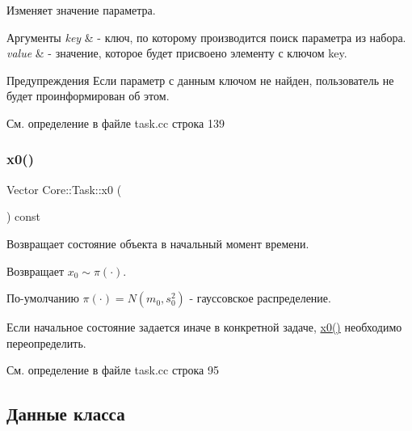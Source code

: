 Изменяет значение параметра. 


\begin{DoxyParams}{Аргументы}
{\em key} & -\/ ключ, по которому производится поиск параметра из набора. \\
\hline
{\em value} & -\/ значение, которое будет присвоено элементу с ключом key.\\
\hline
\end{DoxyParams}
\begin{DoxyWarning}{Предупреждения}
Если параметр с данным ключом не найден, пользователь не будет проинформирован об этом. 
\end{DoxyWarning}


См. определение в файле task.\+cc строка 139

\hypertarget{class_core_1_1_task_aa550c0258f341215291fba1e8518c135}{}\label{class_core_1_1_task_aa550c0258f341215291fba1e8518c135} 
\subsubsection{\texorpdfstring{x0()}{x0()}}
{\footnotesize\ttfamily Vector Core\+::\+Task\+::x0 (\begin{DoxyParamCaption}{ }\end{DoxyParamCaption}) const\hspace{0.3cm}{\ttfamily [virtual]}}



Возвращает состояние объекта в начальный момент времени. 

\begin{DoxyReturn}{Возвращает}
$x_0 \sim \pi(\cdot)$.
\end{DoxyReturn}
По-\/умолчанию $\pi(\cdot) = N(m_0, s_0^2)$ -\/ гауссовское распределение.

Если начальное состояние задается иначе в конкретной задаче, \hyperlink{class_core_1_1_task_aa550c0258f341215291fba1e8518c135}{x0()} необходимо переопределить. 

См. определение в файле task.\+cc строка 95



\subsection{Данные класса}
\hypertarget{class_core_1_1_task_a1482a9a5e2a70c22fa58d2695a680890}{}\label{class_core_1_1_task_a1482a9a5e2a70c22fa58d2695a680890} 
